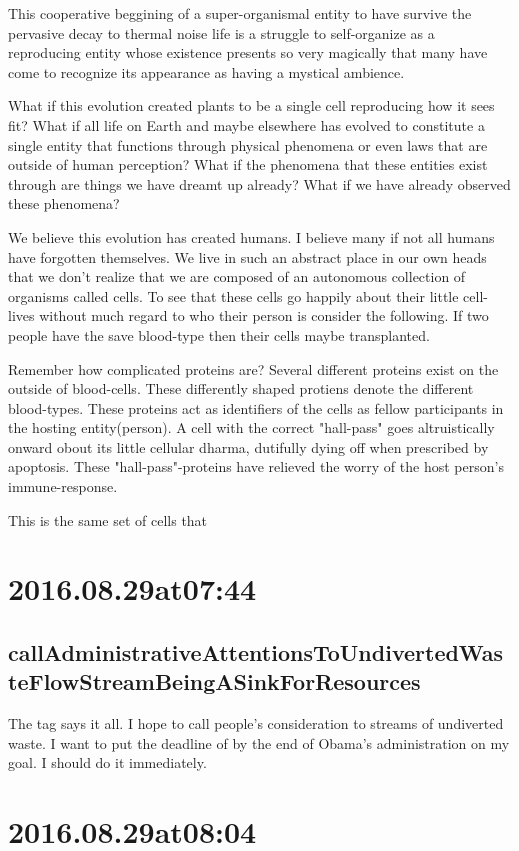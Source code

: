 \begin{enumerate}
\begin{enumerate}
This cooperative beggining of a super-organismal entity to have survive the pervasive decay to thermal noise life is a struggle to self-organize as a reproducing entity whose existence presents so very magically that many have come to recognize its appearance as having a mystical ambience.

What if this evolution created plants to be a single cell reproducing how it sees fit? What if all life on Earth and maybe elsewhere has evolved to constitute a single entity that functions through physical phenomena or even laws that are outside of human perception? What if the phenomena that these entities exist through are things we have dreamt up already? What if we have already observed these phenomena?

We believe this evolution has created humans. I believe many if not all humans have forgotten themselves. We live in such an abstract place in our own heads that we don't realize that we are composed of an autonomous collection of organisms called cells. To see that these cells go happily about their little cell-lives without much regard to who their person is consider the following. If two people have the save blood-type then their cells maybe transplanted.

Remember how complicated proteins are? Several different proteins exist on the outside of blood-cells. These differently shaped protiens denote the different  blood-types. These proteins act as identifiers of the cells as fellow participants in the hosting entity(person). A cell with the correct "hall-pass" goes altruistically onward obout its little cellular dharma, dutifully dying off when prescribed by apoptosis. These "hall-pass"-proteins have relieved the worry of the host person's immune-response.

This is the same set of cells that 

\section*{ 2016.08.29at07:44 }
\subsection*{callAdministrativeAttentionsToUndivertedWasteFlowStreamBeingASinkForResources}
The tag says it all. I hope to call people's consideration to streams of undiverted waste. I want to put the deadline of by the end of Obama's administration on my goal. I should do it immediately.

\section*{ 2016.08.29at08:04 }

\end{enumerate}
\end{enumerate}
